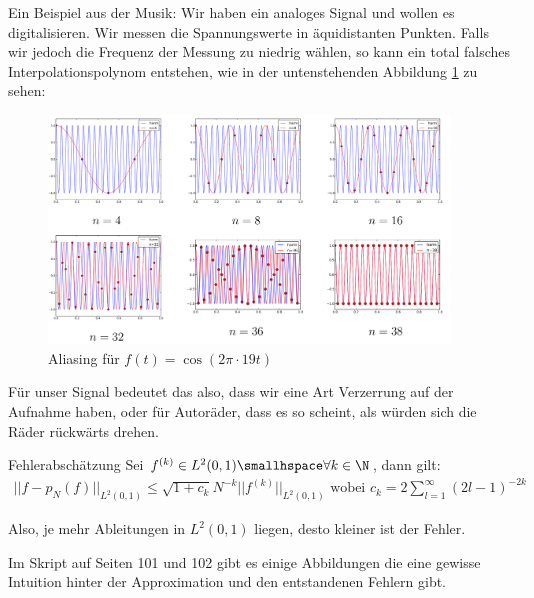 \inlineex Ein Beispiel aus der Musik: Wir haben ein analoges Signal und wollen es digitalisieren. 
Wir messen die Spannungswerte in äquidistanten Punkten. 
Falls wir jedoch die Frequenz der Messung zu niedrig wählen, so kann ein total falsches Interpolationspolynom entstehen,
wie in der untenstehenden Abbildung \ref{fig:aliasing} zu sehen:
\begin{figure}[h!]
    \begin{center}
        \includegraphics[width=0.95\textwidth]{assets/01_interpolation/01_trigonometric/aliasing-in-music.png}
    \end{center}
    \caption{Aliasing für $f(t) = \cos(2\pi \cdot 19t)$}\label{fig:aliasing}
\end{figure}
Für unser Signal bedeutet das also, dass wir eine Art Verzerrung auf der Aufnahme haben, oder für Autoräder, dass es so scheint, als würden sich die Räder rückwärts drehen.

\begin{theorem}[]{Fehlerabschätzung}
    Sei $f^{(k)} \in L^2(0, 1) \smallhspace \forall k \in \N$, dann gilt:
    \rmvspace
    \begin{align*}
        ||f - p_N(f)||_{L^2(0, 1)} \leq \sqrt{1 + c_k} N^{-k} ||f^{(k)}||_{L^2(0, 1)} \text{ wobei } c_k = 2 \sum_{l = 1}^{\infty} (2l - 1)^{-2k}
    \end{align*}
\end{theorem}
Also, je mehr Ableitungen in $L^2(0, 1)$ liegen, desto kleiner ist der Fehler.


Im Skript auf Seiten 101 und 102 gibt es einige Abbildungen die eine gewisse Intuition hinter der Approximation und den entstandenen Fehlern gibt.

